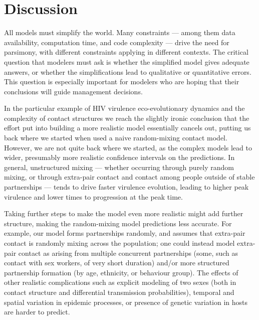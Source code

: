 \documentclass[10pt,letterpaper]{article}
\newcommand{\etal}{\textit{et al.}}
\begin{document}
\section*{Discussion}

All models must simplify the world.  Many constraints --- among them data
availability, computation time, and code complexity --- drive the need
for parsimony, with different constraints applying in different
contexts. The critical question that modelers must ask is whether the
simplified model gives adequate answers, or whether the
simplifications lead to qualitative or quantitative errors.
This question is especially important for modelers who
are hoping that their conclusions will guide management decisions.

In the particular example of HIV virulence eco-evolutionary dynamics
and the complexity of contact structures
we reach the slightly ironic conclusion that the
effort put into building a more realistic model essentially cancels
out, putting us back where we started when used a naive random-mixing
contact model.
However, we are not quite back where we started, as the
complex models lead to wider, presumably more realistic
confidence intervals on the predictions.
In general, unstructured mixing --- whether occurring through 
purely random mixing, or through extra-pair contact and contact
among people outside of stable partnerships --- tends to drive
faster virulence evolution, leading to higher peak virulence and 
lower times to progression at the peak time.

Taking further steps to make the model even more realistic
might add further structure,
making the random-mixing model predictions less accurate. For
example, our model forms partnerships randomly, and assumes that
extra-pair contact is randomly mixing across the population;
one could instead model extra-pair contact as arising from
multiple concurrent partnerships (some, such as contact with sex
workers, of very short duration) and/or more structured partnership
formation (by age, ethnicity, or behaviour group). The effects of
other realistic complications such as explicit modeling of two
sexes (both in contact structure and differential transmission
probabilities), temporal and spatial variation in epidemic processes,
or presence of genetic variation in hosts are harder to predict.
\end{document}
